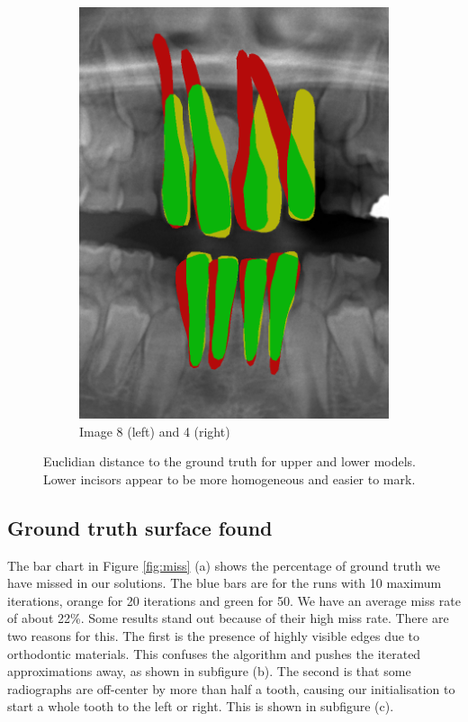 \documentclass[a4paper,titlepage,12pt]{article}
\begin{document}
\begin{figure}
\begin{subfigure}{0.65\linewidth}
		\includegraphics[width=0.45\columnwidth]{results/4i50}
		\caption{Image 8 (left) and 4 (right)}
	\end{subfigure}
	\caption{Euclidian distance to the ground truth for upper and lower models. Lower incisors appear to be more homogeneous and easier to mark. } 
	\label{fig:euclud}
\end{figure}

\subsection{Ground truth surface found}
The bar chart in Figure \ref{fig:miss} (a) shows the percentage of ground truth we have missed in our solutions. The {\color{blue} blue} bars are for the runs with 10 maximum iterations, {\color{orange} orange} for 20 iterations and {\color{green} green} for 50. We have an average miss rate of about 22\%. Some results stand out because of their high miss rate. There are two reasons for this. The first is the presence of highly visible edges due to orthodontic materials. This confuses the algorithm and pushes the iterated approximations away, as shown in subfigure (b). The second is that some radiographs are off-center by more than half a tooth, causing our initialisation to start a whole tooth to the left or right. This is shown in subfigure (c). 
\end{document}
